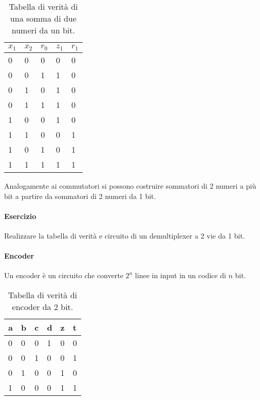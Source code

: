 \begin{table}[H]
	\centering
	\caption{Tabella di verità di una somma di due numeri da un bit.}
	\label{tab:sum1bit}
	\begin{tabular}{|lll|l|l|}
		\hline
		$ x_{1} $ & $ x _{2} $ & $ r_0 $ & $ z_1 $ & $r_1$ \\ \hline
		0         & 0          & 0       & 0       & 0     \\
		0         & 0          & 1       & 1       & 0     \\
		0         & 1          & 0       & 1       & 0     \\
		0         & 1          & 1       & 1       & 0     \\
		1         & 0          & 0       & 1       & 0     \\
		1         & 1          & 0       & 0       & 1     \\
		1         & 0          & 1       & 0       & 1     \\
		1         & 1          & 1       & 1       & 1     \\ \hline
	\end{tabular}
\end{table}


Analogamente ai commutatori si possono costruire sommatori di 2 numeri a più bit a partire da sommatori di 2 numeri da 1 bit.


\paragraph{Esercizio}
Realizzare la tabella di verità e circuito di un demultiplexer a 2 vie da 1 bit.

\paragraph{Encoder}
Un encoder è un circuito che converte $ 2^n $ linee in input in un codice di $ n $ bit. 

\begin{table}[H]
	\centering
	\caption{Tabella di verità di encoder da 2 bit.}
	\label{tab:2bitencoder}
	\begin{tabular}{|llll|ll|}
		\hline
		a & b & c & d & z & t \\ \hline
		0 & 0 & 0 & 1 & 0 & 0 \\
		0 & 0 & 1 & 0 & 0 & 1 \\
		0 & 1 & 0 & 0 & 1 & 0 \\
		1 & 0 & 0 & 0 & 1 & 1 \\ \hline
	\end{tabular}
\end{table}

